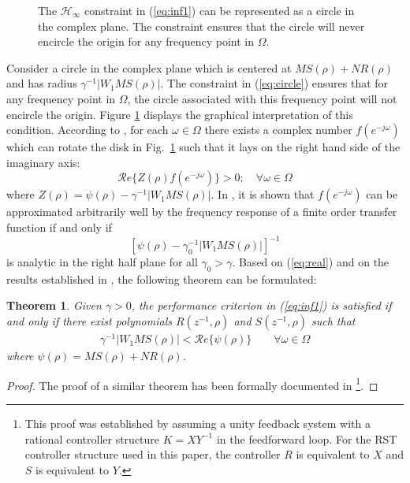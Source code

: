 \documentclass[a4paper, 10pt, conference]{ieeeconf}
\newtheorem{theorem}{Theorem}
\begin{document}
\begin{figure}
\centering
\resizebox{0.8\columnwidth}{!}{}
\caption{The $\mathcal{H}_{\infty}$ constraint in (\ref{eq:inf1}) can be represented as a circle in the complex plane. The constraint ensures that the circle will never encircle the origin for any frequency point in $\Omega$.}
\label{fig:circle}
\end{figure}
Consider a circle in the complex plane which is centered at $MS(\rho) + NR(\rho)$ and has radius $\gamma^{-1}|W_1MS(\rho)|$. The constraint in (\ref{eq:circle}) ensures that for any frequency point in $\Omega$, the circle associated with this frequency point will not encircle the origin. Figure \ref{fig:circle} displays the graphical interpretation of this condition. According to \cite{KZ04}, for each $\omega \in \Omega$ there exists a complex number $f(e^{-j\omega})$ which can rotate the disk in Fig.~\ref{fig:circle} such that it lays on the right hand side of the imaginary axis:
\begin{equation}\label{eq:real}
\mathcal{R}e\{Z(\rho) f(e^{-j\omega}) \} > 0; \quad \forall \omega \in \Omega
\end{equation}
where $Z(\rho) = \psi(\rho) - \gamma^{-1} |W_1MS(\rho)|$. In \cite{RM94}, it is shown that $f(e^{-j\omega})$ can be approximated arbitrarily well by the frequency response of a finite order transfer function if and only if $$[\psi(\rho) - \gamma_0^{-1}|W_1MS(\rho)|]^{-1}$$ is analytic in the right half plane for all $\gamma_0 > \gamma$. Based on (\ref{eq:real}) and on the results established in \cite{KZ04}, the following theorem can be formulated:
\begin{theorem}
Given $\gamma > 0$,  the performance criterion in (\ref{eq:inf1}) is satisfied if and only if there exist polynomials $R(z^{-1},\rho)$ and $S(z^{-1},\rho)$ such that
\begin{equation}
\begin{aligned} \label{eq:con1}
\gamma^{-1} |W_1MS(\rho)| < \mathcal{R}e\{\psi(\rho) \} \qquad 
\forall \omega \in \Omega 
\end{aligned}
\end{equation}
where $\psi(\rho) = MS(\rho) + NR(\rho)$.
\end{theorem}
\begin{proof}
The proof of a similar theorem has been formally documented in \cite{KZ04}\footnote{This proof was established by assuming a unity feedback system with a rational controller structure $K = XY^{-1}$ in the feedforward loop. For the RST controller structure used in this paper, the controller $R$ is equivalent to $X$ and $S$ is equivalent to $Y$.}.
\end{proof}
\end{document}
